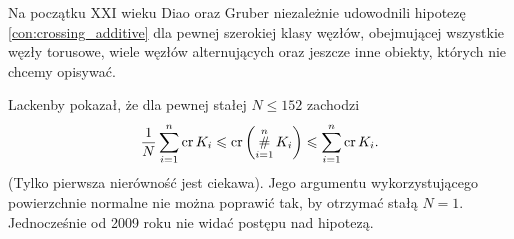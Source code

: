 Na początku XXI wieku Diao \cite{diao2004} oraz Gruber \cite{gruber2003} niezależnie udowodnili hipotezę \ref{con:crossing_additive} dla pewnej szerokiej klasy węzłów, obejmującej wszystkie węzły torusowe, wiele węzłów alternujących oraz jeszcze inne obiekty, których nie chcemy opisywać.
%
%
%

Lackenby \cite{lackenby2009} pokazał, że dla pewnej stałej $N \le 152$ zachodzi
\begin{equation}
    \frac 1 N \sum_{i=1}^n \operatorname{cr}{K_i} \leqslant \operatorname{cr} \left(\operatorname*{\#}_{i=1}^n K_i\right) \leqslant \sum_{i=1}^n \operatorname{cr}{K_i}.
\end{equation}
(Tylko pierwsza nierówność jest ciekawa).
Jego argumentu wykorzystującego powierzchnie normalne nie można poprawić tak, by otrzymać stałą $N = 1$.
Jednocześnie od 2009 roku nie widać postępu nad hipotezą.

%


